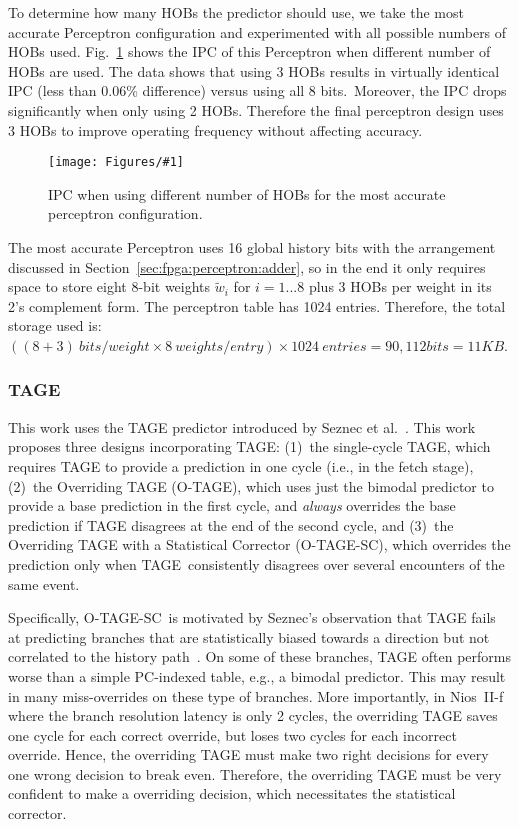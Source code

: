 \documentclass[conference]{IEEEtran}
\newcommand{\kfig}[4]{ %
        \begin{figure}[!t]
        \centering
        \texttt{[image: Figures/\#1]}
        \vspace{-1mm}
        \caption{#3}
        \label{#2}
        \end{figure}
}
\begin{document}
To determine how many HOBs the predictor should use, we take the most accurate Perceptron configuration and experimented with all possible numbers of HOBs used. Fig.~\ref{fig:perceptronHOB} shows the IPC of this Perceptron when different number of HOBs are used. The data shows that using 3 HOBs results in virtually identical IPC (less than 0.06\% difference) versus using all 8 bits.\ Moreover, the IPC drops significantly when only using 2 HOBs. Therefore the final perceptron design uses 3 HOBs to improve operating frequency without affecting accuracy.
\kfig{perceptronHOB.pdf}{fig:perceptronHOB}{IPC when using different number of HOBs for the most accurate perceptron configuration.}{angle = 0, trim = 1in 1.5in 0.9in 1.7in, clip, width=0.4\textwidth}

The most accurate Perceptron uses 16 global history bits with the arrangement discussed in Section~\ref{sec:fpga:perceptron:adder}, so in the end it only requires space to store eight 8-bit weights $\widetilde{w}_{i}$ for $i = 1...8$ plus 3 HOBs per weight in its 2's complement form. The perceptron table has 1024 entries. Therefore, the total storage used is: $ ((8+ 3)\ bits/weight \times 8\ weights/entry)\times 1024\ entries  = 90,112 bits = 11KB$. 

\subsubsection{TAGE}
\label{sec:eval:ipc:tage}
This work uses the TAGE predictor introduced by Seznec et al.~\cite{tage}.  This work proposes three designs incorporating TAGE:  (1)~the single-cycle TAGE, which requires TAGE to provide a prediction in one cycle (i.e., in the fetch stage), (2)~the Overriding TAGE (\mbox{O-TAGE}), which uses just the bimodal predictor to provide a base prediction in the first cycle, and \textit{always} overrides the base prediction if TAGE disagrees at the end of the second cycle, and (3)~the Overriding TAGE with a Statistical Corrector (\mbox{O-TAGE-SC}), which overrides the prediction only when TAGE\ consistently disagrees over several encounters of the same event.

Specifically,  \mbox{O-TAGE-SC}\ is motivated by Seznec's observation that TAGE fails at predicting branches that are statistically biased towards a direction but not correlated to the history path~\cite{isltage}. On some of these branches, TAGE often performs worse than a simple PC-indexed table, e.g., a bimodal predictor. This may result in many miss-overrides on these type of branches. More importantly, in Nios~II-f where the branch resolution latency is only 2 cycles, the overriding TAGE saves one cycle for each correct override, but loses two cycles for each incorrect override. Hence, the overriding TAGE must make two right decisions for every one wrong decision to break even. Therefore, the overriding TAGE must be very confident to make a overriding decision, which necessitates the statistical corrector.
\end{document}
